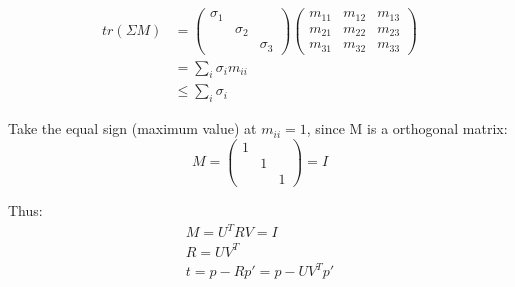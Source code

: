\documentclass{article}
\begin{document}
\begin{align}
    tr(\Sigma M)&=
\begin{pmatrix}
    \sigma_1 &  & \\
     & \sigma_2 & \\
    &  & \sigma_3
\end{pmatrix}
\begin{pmatrix}
    m_{11} & m_{12} & m_{13} \\
    m_{21} & m_{22} & m_{23} \\
    m_{31} & m_{32} & m_{33}
\end{pmatrix}
\\
&=\sum_{i}\sigma_im_{ii}\\
&\leq \sum_{i}\sigma_i
\end{align}

\par
Take the equal sign (maximum value) at $m_{ii}=1$,
since M is a orthogonal matrix:
\begin{equation}
    M=
\begin{pmatrix}
    1 &  & \\
     & 1 & \\
    &  & 1
\end{pmatrix}
=I
\end{equation}
\par
Thus:
\begin{gather}
    M=U^TRV=I\\
    R = UV^T\\
    t= p-Rp'=p-UV^Tp'
\end{gather}
\cite{*}


\end{document}
